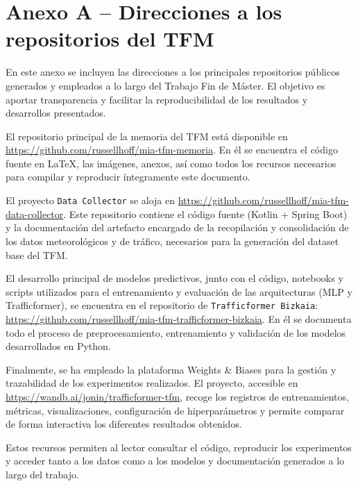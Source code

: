 \section*{Anexo A – Direcciones a los repositorios del TFM}
\label{anexo:sensores}

En este anexo se incluyen las direcciones a los principales repositorios públicos generados y empleados a lo largo del Trabajo Fin de Máster. El objetivo es aportar transparencia y facilitar la reproducibilidad de los resultados y desarrollos presentados.

El repositorio principal de la memoria del TFM está disponible en \url{https://github.com/russellhoff/mia-tfm-memoria}. En él se encuentra el código fuente en \LaTeX{}, las imágenes, anexos, así como todos los recursos necesarios para compilar y reproducir íntegramente este documento.

El proyecto \texttt{Data Collector} se aloja en \url{https://github.com/russellhoff/mia-tfm-data-collector}. Este repositorio contiene el código fuente (Kotlin + Spring Boot) y la documentación del artefacto encargado de la recopilación y consolidación de los datos meteorológicos y de tráfico, necesarios para la generación del dataset base del TFM.

El desarrollo principal de modelos predictivos, junto con el código, notebooks y scripts utilizados para el entrenamiento y evaluación de las arquitecturas (MLP y Trafficformer), se encuentra en el repositorio de \texttt{Trafficformer Bizkaia}: \url{https://github.com/russellhoff/mia-tfm-trafficformer-bizkaia}. En él se documenta todo el proceso de preprocesamiento, entrenamiento y validación de los modelos desarrollados en Python.

Finalmente, se ha empleado la plataforma Weights \& Biases para la gestión y trazabilidad de los experimentos realizados. El proyecto, accesible en \url{https://wandb.ai/jonin/trafficformer-tfm}, recoge los registros de entrenamientos, métricas, visualizaciones, configuración de hiperparámetros y permite comparar de forma interactiva los diferentes resultados obtenidos.

\vspace{0.5cm}

Estos recursos permiten al lector consultar el código, reproducir los experimentos y acceder tanto a los datos como a los modelos y documentación generados a lo largo del trabajo.